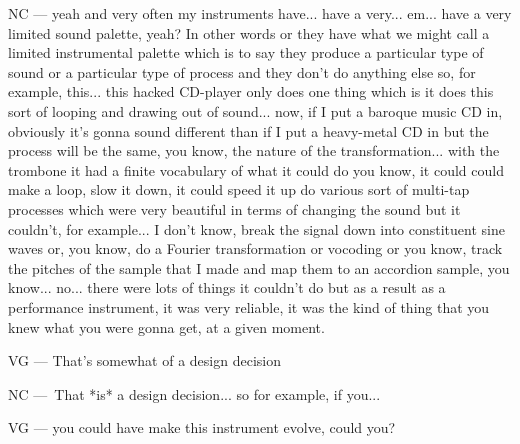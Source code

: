 NC — yeah and very often my instruments have... have a very... em... have a very limited sound palette, yeah? In other words or they have what we might call a limited instrumental palette which is to say they produce a particular type of sound or a particular type of process and they don't do anything else so, for example, this...  this hacked CD-player only does one thing which is it does this sort of looping and drawing out of sound... now, if I put a baroque music CD in, obviously it's gonna sound different than if I put a heavy-metal CD in but the process will be the same, you know, the nature of the transformation... with the trombone it had a finite vocabulary of what it could do you know, it could could make a loop, slow it down, it could speed it up do various sort of multi-tap processes which were very beautiful in terms of changing the sound but it couldn't, for example... I don't know, break the signal down into constituent sine waves or, you know, do a Fourier transformation or vocoding or you know, track the pitches of the sample that I made and map them to an accordion sample, you know... no... there were lots of things it couldn't do but as a result as a performance instrument, it was very reliable, it was the kind of thing that you knew what you were gonna get, at a given moment. 

VG — That's somewhat of a design decision 

NC — That *is* a design decision... so for example, if you... 

VG — you could have make this instrument evolve, could you? 

